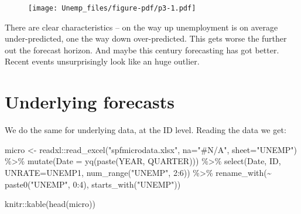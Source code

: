 \documentclass[
  letterpaper,
]{book}
\newenvironment{Shaded}{\begin{snugshade}}{\end{snugshade}}
\newcommand{\AttributeTok}[1]{\textcolor[rgb]{0.40,0.45,0.13}{#1}}
\newcommand{\DecValTok}[1]{\textcolor[rgb]{0.68,0.00,0.00}{#1}}
\newcommand{\FunctionTok}[1]{\textcolor[rgb]{0.28,0.35,0.67}{#1}}
\newcommand{\NormalTok}[1]{\textcolor[rgb]{0.00,0.23,0.31}{#1}}
\newcommand{\OtherTok}[1]{\textcolor[rgb]{0.00,0.23,0.31}{#1}}
\newcommand{\SpecialCharTok}[1]{\textcolor[rgb]{0.37,0.37,0.37}{#1}}
\newcommand{\StringTok}[1]{\textcolor[rgb]{0.13,0.47,0.30}{#1}}
\begin{document}
\begin{figure}[H]

{\centering \texttt{[image: Unemp\_files/figure-pdf/p3-1.pdf]}

}

\end{figure}

There are clear characteristics -- on the way up unemployment is on
average under-predicted, one the way down over-predicted. This gets
worse the further out the forecast horizon. And maybe this century
forecasting has got better. Recent events unsurprisingly look like an
huge outlier.

\hypertarget{underlying-forecasts}{%
\section{Underlying forecasts}\label{underlying-forecasts}}

We do the same for underlying data, at the ID level. Reading the data we
get:

\begin{Shaded}
\begin{Highlighting}[]
\NormalTok{micro }\OtherTok{\textless{}{-}}\NormalTok{ readxl}\SpecialCharTok{::}\FunctionTok{read\_excel}\NormalTok{(}\StringTok{"spfmicrodata.xlsx"}\NormalTok{, }\AttributeTok{na=}\StringTok{"\#N/A"}\NormalTok{, }\AttributeTok{sheet=}\StringTok{"UNEMP"}\NormalTok{)  }\SpecialCharTok{\%\textgreater{}\%}
  \FunctionTok{mutate}\NormalTok{(}\AttributeTok{Date =} \FunctionTok{yq}\NormalTok{(}\FunctionTok{paste}\NormalTok{(YEAR, QUARTER))) }\SpecialCharTok{\%\textgreater{}\%} 
  \FunctionTok{select}\NormalTok{(Date, ID, }\AttributeTok{UNRATE=}\NormalTok{UNEMP1, }\FunctionTok{num\_range}\NormalTok{(}\StringTok{"UNEMP"}\NormalTok{, }\DecValTok{2}\SpecialCharTok{:}\DecValTok{6}\NormalTok{)) }\SpecialCharTok{\%\textgreater{}\%}
  \FunctionTok{rename\_with}\NormalTok{(}\SpecialCharTok{\textasciitilde{}} \FunctionTok{paste0}\NormalTok{(}\StringTok{"UNEMP"}\NormalTok{, }\DecValTok{0}\SpecialCharTok{:}\DecValTok{4}\NormalTok{), }\FunctionTok{starts\_with}\NormalTok{(}\StringTok{"UNEMP"}\NormalTok{))}

\NormalTok{knitr}\SpecialCharTok{::}\FunctionTok{kable}\NormalTok{(}\FunctionTok{head}\NormalTok{(micro))}
\end{Highlighting}
\end{Shaded}
\end{document}
